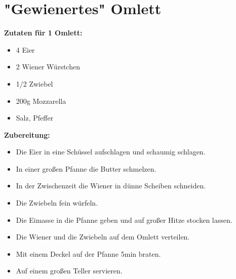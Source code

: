 \section{"Gewienertes" Omlett}

\textbf{Zutaten für 1 Omlett:}
\begin{itemize}
  \item 4 Eier
  \item 2 Wiener Würstchen
  \item 1/2 Zwiebel
  \item 200g Mozzarella
  \item Salz, Pfeffer
\end{itemize}

\textbf{Zubereitung:}
\begin{itemize}
  \item Die Eier in eine Schüssel aufschlagen und schaumig schlagen.
  \item In einer großen Pfanne die Butter schmelzen.
  \item In der Zwischenzeit die Wiener in dünne Scheiben schneiden.
  \item Die Zwiebeln fein würfeln.
  \item Die Eimasse in die Pfanne geben und auf großer Hitze stocken lassen.
  \item Die Wiener und die Zwiebeln auf dem Omlett verteilen.
  \item Mit einem Deckel auf der Pfanne 5min braten.
  \item Auf einem großen Teller servieren.
\end{itemize}
